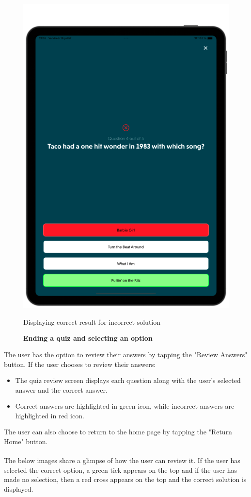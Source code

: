 \begin{figure}[H]
\begin{minipage}[b]{0.43\linewidth}
        \includegraphics[width=\linewidth]{TabletUI/Displaying correct result for incorrect solution.png}
        \caption{Displaying correct result for incorrect solution}
    \end{minipage}
    \vspace{0.5cm}
    \caption{\textbf{Ending a quiz and selecting an option}}
\end{figure}

The user has the option to review their answers by tapping the "Review Answers" button.
If the user chooses to review their answers:
    \begin{itemize}
        \item The quiz review screen displays each question along with the user's selected answer and the correct answer.
        \item Correct answers are highlighted in green icon, while incorrect answers are highlighted in red icon.
    \end{itemize}
The user can also choose to return to the home page by tapping the "Return Home" button. \\\\
The below images share a glimpse of how the user can review it. If the user has selected the correct option, a green tick appears on the top and if the user has made no selection, then a red cross appears on the top and the correct solution is displayed.


